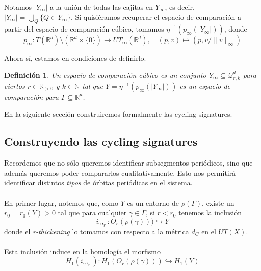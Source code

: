 \documentclass[12pt,a4paper]{article}
\newtheorem{definition}[theorem]{Definición}
\begin{document}
Notamos $|Y_\infty|$ a la unión de todas las cajitas en $Y_\infty$, es decir, $\displaystyle |Y_\infty| = \bigcup_Q \{ Q \in Y_\infty \}$. Si quisiéramos recuperar el espacio de comparación a partir del espacio de comparación cúbico, tomamos $\eta^{-1}(p_\infty(|Y_\infty|))$, donde
\[
p_\infty: T(\mathbb{R}^d) \setminus(\mathbb{R}^d \times \{0\}) \rightarrow UT_\infty(\mathbb{R}^d), \quad (p,v) \mapsto (p, v/\|v\|_\infty)
\]

Ahora sí, estamos en condiciones de definirlo.
\begin{definition}
    Un \textit{espacio de comparación cúbico} es un conjunto $Y_\infty \subseteq \mathcal{Q}^d_{r,k}$ para ciertos $r \in \mathbb{R}_{>0}$ y $k \in \mathbb{N}$ tal que $Y = \eta^{-1}(p_\infty(|Y_\infty|))$ es un espacio de comparación para $\Gamma \subseteq \mathbb{R}^d$.
\end{definition}
En la siguiente sección construiremos formalmente las cycling signatures.
\subsection{Construyendo las cycling signatures}
Recordemos que no sólo queremos identificar subsegmentos periódicos, sino que además queremos poder compararlos cualitativamente. Esto nos permitirá identificar distintos \textit{tipos} de órbitas periódicas en el sistema.
\\
\\
En primer lugar, notemos que, como $Y$ es un entorno de $\rho(\Gamma)$, existe un $r_0 = r_0(Y) > 0$ tal que para cualquier $\gamma \in \Gamma$, si $r < r_0$ tenemos la inclusión
\[
    i_\gamma,_r : {O_r}(\rho(\gamma))) \hookrightarrow Y
\]
donde el \textit{r-thickening} lo tomamos con respecto a la métrica $d_C$ en el $UT(X)$.
\\
\\
Esta inclusión induce en la homología el morfismo
\[
    H_1(i_\gamma,_r): H_1({O_r}(\rho(\gamma))) \hookrightarrow H_1(Y)
\]
\end{document}
